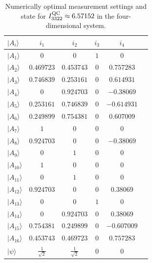 \documentclass[prl,letterpaper,english,reprint,nofootinbib,aps,superscriptaddress,showpacs,showkeys]{revtex4-1}
\theoremstyle{definition}
\theoremstyle{remark}
\begin{document}
\begin{table}[t]
\centering
  \begin{tabular}{lccccc} \hline \hline
$|A_i\rangle$ & $i_1$ & $i_2$ & $i_3$ & $i_4$  \\
\hline
$|A_1\rangle$ & $0$ & $0$ & $1$ & $0$  \\
$|A_2\rangle$  & $0.469723$ & $0.453743$ & $0$ & $0.757283$  \\
$|A_3\rangle$ & $0.746839$ & $0.253161$ & $0$ & $0.614931$  \\
$|A_4\rangle$  & $0$ & $0.924703$ & $0$ & $-0.38069$  \\
$|A_5\rangle$ & $0.253161$ & $0.746839$ & $0$ & $-0.614931$  \\
$|A_6\rangle$ & $0.249899$ & $0.754381$ & $0$ & $0.607009$  \\
$|A_7\rangle$ & $1$ & $0$ & $0$ & $0$  \\
$|A_8\rangle$  & $0.924703$ & $0$ & $0$ & $-0.38069$  \\
$|A_9\rangle$  & $0$ & $1$ & $0$ & $0$  \\
$|A_{10}\rangle$  & $1$ & $0$ & $0$ & $0$ \\
$|A_{11}\rangle$ & $0$ & $1$ & $0$ & $0$  \\
$|A_{12}\rangle$  & $0.924703$ & $0$ & $0$ & $0.38069$  \\
$|A_{13}\rangle$  & $0$ & $0$ & $1$ & $0$  \\
$|A_{14}\rangle$  & $0$ & $0.924703$ & $0$ & $0.38069$  \\
$|A_{15}\rangle$ & $0.754381$ & $0.249899$ & $0$ & $-0.607009$  \\
$|A_{16}\rangle$  & $0.453743$ & $0.469723$ & $0$ & $0.757283$  \\
\hline
$|\psi\rangle$ & $\frac{1}{\sqrt{2}}$ & $\frac{1}{\sqrt{2}}$ & $0$ & $0$\\
  \hline \hline
   \end{tabular}
\caption{Numerically optimal measurement settings and state for $I_{3322}^{\rm QC}\approx6.57152$  in the four-dimensional system.}
\label{numerica3}
\end{table}
\end{document}
